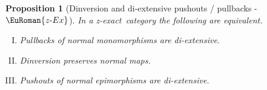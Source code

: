 \documentclass [12pt,oneside]{book}%
\theoremstyle{captionstyle}  %
\newtheorem{proposition}[theorem]{Proposition}
\newenvironment{tfae}{		%
	\begin{enumerate}[(I)]}{
	\end{enumerate}
}
\newcommand{\hy}{\text{-}}													%
\newcommand{\ZExact}{z-exact}									%
\newcommand{\ZExactTag}{ - {\color{Cerulean} $\EuRoman{z\hy Ex}$}}
\begin{document}
\begin{proposition}[Dinversion and di-extensive pushouts / pullbacks\ZExactTag]
    \label{thm:AntiNormalInversion-DoubleExtensivePush/Pull}%
    \label{thm:Dinversion-DiExtensivePush/Pull}%
    In a \ZExact\ category the following are equivalent.
    \begin{tfae}
        \item \label{thm:Dinversion-DiExtensivePush/Pull-Pull}%
        Pullbacks of normal monomorphisms are di-extensive.
        \item \label{thm:Dinversion-DiExtensivePush/Pull-DPN->N}%
        Dinversion preserves normal maps.
        \item \label{thm:Dinversion-DiExtensivePush/Pull-Push}%
        Pushouts of normal epimorphisms are di-extensive.
    \end{tfae}
\end{proposition}
\end{document}
